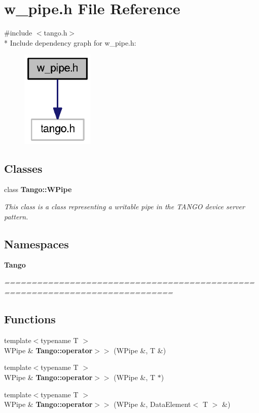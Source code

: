 \section{w\-\_\-pipe.\-h File Reference}
\label{w__pipe_8h}
{\ttfamily \#include $<$tango.\-h$>$}\\*
Include dependency graph for w\-\_\-pipe.\-h\-:
\nopagebreak
\begin{figure}[H]
\begin{center}
\leavevmode
\includegraphics[width=98pt]{d7/de6/w__pipe_8h__incl}
\end{center}
\end{figure}
\subsection*{Classes}
\begin{DoxyCompactItemize}
\item 
class {\bf Tango\-::\-W\-Pipe}
\begin{DoxyCompactList}\small\item\em This class is a class representing a writable pipe in the T\-A\-N\-G\-O device server pattern. \end{DoxyCompactList}\end{DoxyCompactItemize}
\subsection*{Namespaces}
\begin{DoxyCompactItemize}
\item 
{\bf Tango}
\begin{DoxyCompactList}\small\item\em ============================================================================= \end{DoxyCompactList}\end{DoxyCompactItemize}
\subsection*{Functions}
\begin{DoxyCompactItemize}
\item 
{\footnotesize template$<$typename T $>$ }\\W\-Pipe \& {\bf Tango\-::operator$>$$>$} (W\-Pipe \&, T \&)
\item 
{\footnotesize template$<$typename T $>$ }\\W\-Pipe \& {\bf Tango\-::operator$>$$>$} (W\-Pipe \&, T $\ast$)
\item 
{\footnotesize template$<$typename T $>$ }\\W\-Pipe \& {\bf Tango\-::operator$>$$>$} (W\-Pipe \&, Data\-Element$<$ T $>$ \&)
\end{DoxyCompactItemize}
